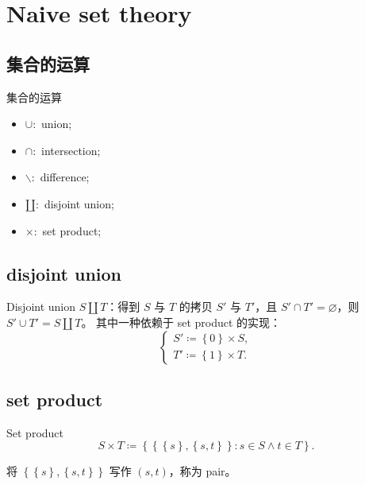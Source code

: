 

\section{Naive set theory}


\subsection{集合的运算}

\begin{defi}{集合的运算}
    \begin{itemize}
        \item \(\cup:\) union;
        \item \(\cap:\) intersection;
        \item \(\backslash:\) difference;
        \item \(\amalg :\) disjoint union;
        \item \(\times :\) set product;
    \end{itemize}
\end{defi}

\subsection{disjoint union}


\begin{defi}{Disjoint union}
    \(S \amalg T\)：得到 \(S\) 与 \(T\) 的拷贝 \(S'\) 与 \(T'\)，且 \(S' \cap T' = \varnothing\)，则 \(S' \cup T' = S\amalg T\)。
    其中一种依赖于 set product 的实现：
    \[
        \begin{cases}
            S' \coloneqq \left\{ 0 \right\} \times S, \\
            T' \coloneqq \left\{ 1 \right\} \times T.
        \end{cases}
    \]
\end{defi}

\subsection{set product}

\begin{defi}{Set product}
    \[
        S \times T\coloneqq \left\{ \left\{ \left\{ s \right\} ,\left\{ s,t \right\}  \right\} : s\in S\land t\in T \right\}
        .\]

    将 \(\left\{ \left\{ s \right\} ,\left\{ s,t \right\}  \right\}\) 写作 \((s,t)\)，称为 pair。
\end{defi}
